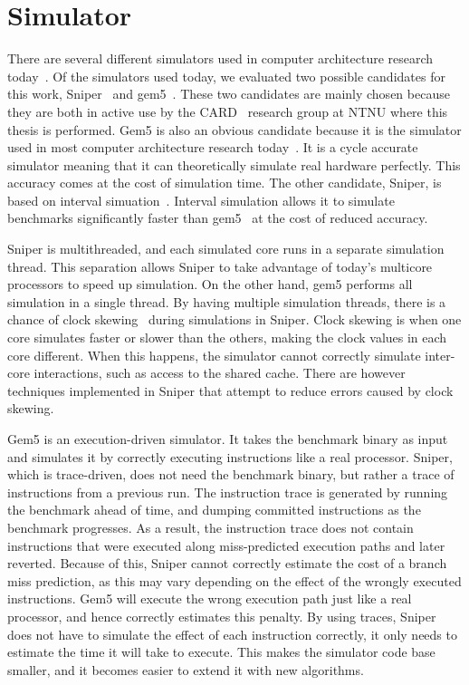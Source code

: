 \section{Simulator}
\label{sec:framework:simulator}

There are several different simulators used in computer architecture research today~\cite{Carlson2011a, Binkert2011, Miller2010, Pellauer2011}.
Of the simulators used today, we evaluated two possible candidates for this work, Sniper~\cite{Carlson2011a} and gem5~\cite{Binkert2011}.
These two candidates are mainly chosen because they are both in active use by the CARD~\cite{CARD2015} research group at NTNU where this thesis is performed.
Gem5 is also an obvious candidate because it is the simulator used in most computer architecture research today~\cite{Chen-Han2014}.
It is a cycle accurate simulator meaning that it can theoretically simulate real hardware perfectly.
This accuracy comes at the cost of simulation time.
The other candidate, Sniper, is based on interval simuation~\cite{Genbrugge2010}. 
Interval simulation allows it to simulate benchmarks significantly faster than gem5~\cite{Carlson2011a, Olsen2014} at the cost of reduced accuracy.

Sniper is multithreaded, and each simulated core runs in a separate simulation thread.
This separation allows Sniper to take advantage of today's multicore processors to speed up simulation.
On the other hand, gem5 performs all simulation in a single thread.
By having multiple simulation threads, there is a chance of clock skewing~\cite{Carlson2011a} during simulations in Sniper.
Clock skewing is when one core simulates faster or slower than the others, making the clock values in each core different.
When this happens, the simulator cannot correctly simulate inter-core interactions, such as access to the shared cache.
There are however techniques implemented in Sniper that attempt to reduce errors caused by clock skewing.

Gem5 is an execution-driven simulator. 
It takes the benchmark binary as input and simulates it by correctly executing instructions like a real processor.
Sniper, which is trace-driven, does not need the benchmark binary, but rather a trace of instructions from a previous run.
The instruction trace is generated by running the benchmark ahead of time, and dumping committed instructions as the benchmark progresses.
As a result, the instruction trace does not contain instructions that were executed along miss-predicted execution paths and later reverted.
Because of this, Sniper cannot correctly estimate the cost of a branch miss prediction, as this may vary depending on the effect of the wrongly executed instructions.
Gem5 will execute the wrong execution path just like a real processor, and hence correctly estimates this penalty.
By using traces, Sniper does not have to simulate the effect of each instruction correctly, it only needs to estimate the time it will take to execute.
This makes the simulator code base smaller, and it becomes easier to extend it with new algorithms.

